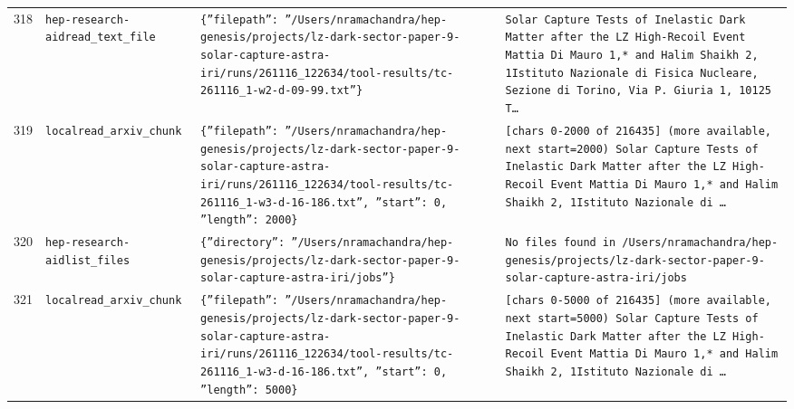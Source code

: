 \documentclass[11pt,a4paper]{article}
\begin{document}
\begin{longtable}{@{}p{}p{}p{}p{}@{}}
318 & \texttt{hep-research-aid}\newline\texttt{read\_\allowbreak{}text\_\allowbreak{}file} & \texttt{\{''filepath'':\allowbreak{} ''/\allowbreak{}Users/\allowbreak{}nramachandra/\allowbreak{}hep-genesis/\allowbreak{}projects/\allowbreak{}lz-dark-sector-paper-9-solar-capture-astra-iri/\allowbreak{}runs/\allowbreak{}261116\_\allowbreak{}122634/\allowbreak{}tool-results/\allowbreak{}tc-261116\_\allowbreak{}1-w2-d-09-99.txt''\}\allowbreak{}} & \texttt{Solar Capture Tests of Inelastic Dark Matter after the LZ High-Recoil Event Mattia Di Mauro 1,\allowbreak{}* and Halim Shaikh 2,\allowbreak{}\dag{}\allowbreak{} 1Istituto Nazionale di Fisica Nucleare,\allowbreak{} Sezione di Torino,\allowbreak{} Via P. Giuria 1,\allowbreak{} 10125 T\ldots{}\allowbreak{}} \\
319 & \texttt{local}\newline\texttt{read\_\allowbreak{}arxiv\_\allowbreak{}chunk} & \texttt{\{''filepath'':\allowbreak{} ''/\allowbreak{}Users/\allowbreak{}nramachandra/\allowbreak{}hep-genesis/\allowbreak{}projects/\allowbreak{}lz-dark-sector-paper-9-solar-capture-astra-iri/\allowbreak{}runs/\allowbreak{}261116\_\allowbreak{}122634/\allowbreak{}tool-results/\allowbreak{}tc-261116\_\allowbreak{}1-w3-d-16-186.txt'',\allowbreak{} ''start'':\allowbreak{} 0,\allowbreak{} ''length'':\allowbreak{} 2000\}\allowbreak{}} & \texttt{[chars 0-2000 of 216435]\allowbreak{} (more available,\allowbreak{} next start=\allowbreak{}2000)\allowbreak{}  Solar Capture Tests of Inelastic Dark Matter after the LZ High-Recoil Event Mattia Di Mauro 1,\allowbreak{}* and Halim Shaikh 2,\allowbreak{}\dag{}\allowbreak{} 1Istituto Nazionale di \ldots{}\allowbreak{}} \\
320 & \texttt{hep-research-aid}\newline\texttt{list\_\allowbreak{}files} & \texttt{\{''directory'':\allowbreak{} ''/\allowbreak{}Users/\allowbreak{}nramachandra/\allowbreak{}hep-genesis/\allowbreak{}projects/\allowbreak{}lz-dark-sector-paper-9-solar-capture-astra-iri/\allowbreak{}jobs''\}\allowbreak{}} & \texttt{No files found in /\allowbreak{}Users/\allowbreak{}nramachandra/\allowbreak{}hep-genesis/\allowbreak{}projects/\allowbreak{}lz-dark-sector-paper-9-solar-capture-astra-iri/\allowbreak{}jobs} \\
321 & \texttt{local}\newline\texttt{read\_\allowbreak{}arxiv\_\allowbreak{}chunk} & \texttt{\{''filepath'':\allowbreak{} ''/\allowbreak{}Users/\allowbreak{}nramachandra/\allowbreak{}hep-genesis/\allowbreak{}projects/\allowbreak{}lz-dark-sector-paper-9-solar-capture-astra-iri/\allowbreak{}runs/\allowbreak{}261116\_\allowbreak{}122634/\allowbreak{}tool-results/\allowbreak{}tc-261116\_\allowbreak{}1-w3-d-16-186.txt'',\allowbreak{} ''start'':\allowbreak{} 0,\allowbreak{} ''length'':\allowbreak{} 5000\}\allowbreak{}} & \texttt{[chars 0-5000 of 216435]\allowbreak{} (more available,\allowbreak{} next start=\allowbreak{}5000)\allowbreak{}  Solar Capture Tests of Inelastic Dark Matter after the LZ High-Recoil Event Mattia Di Mauro 1,\allowbreak{}* and Halim Shaikh 2,\allowbreak{}\dag{}\allowbreak{} 1Istituto Nazionale di \ldots{}\allowbreak{}} \\

\end{longtable}
\end{document}
